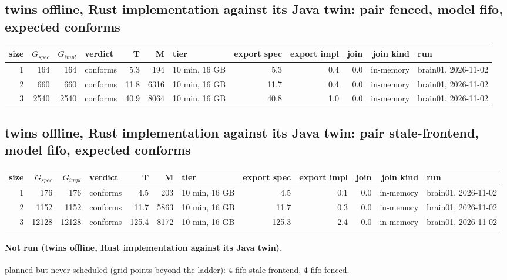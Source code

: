 \documentclass[10pt]{article}
\begin{document}
\subsection*{twins offline, Rust implementation against its Java twin: pair \textsf{fenced}, model fifo, expected conforms}
\begin{longtable}{@{}rrrlrrlrrrrl@{}}
\toprule
size & $G_{\mathit{spec}}$ & $G_{\mathit{impl}}$ & verdict & T & M & tier & export spec & export impl & join & join kind & run \\
\midrule
\endhead
\color{red} 1 & 164 & 164 & conforms & 5.3 & 194 & 10 min, 16 GB & 5.3 & 0.4 & 0.0 & in-memory & brain01, 2026-11-02 \\
\color{red} 2 & 660 & 660 & conforms & 11.8 & 6316 & 10 min, 16 GB & 11.7 & 0.4 & 0.0 & in-memory & brain01, 2026-11-02 \\
\color{red} 3 & 2540 & 2540 & conforms & 40.9 & 8064 & 10 min, 16 GB & 40.8 & 1.0 & 0.0 & in-memory & brain01, 2026-11-02 \\
\bottomrule
\end{longtable}
\subsection*{twins offline, Rust implementation against its Java twin: pair \textsf{stale-frontend}, model fifo, expected conforms}
\begin{longtable}{@{}rrrlrrlrrrrl@{}}
\toprule
size & $G_{\mathit{spec}}$ & $G_{\mathit{impl}}$ & verdict & T & M & tier & export spec & export impl & join & join kind & run \\
\midrule
\endhead
\color{red} 1 & 176 & 176 & conforms & 4.5 & 203 & 10 min, 16 GB & 4.5 & 0.1 & 0.0 & in-memory & brain01, 2026-11-02 \\
\color{red} 2 & 1152 & 1152 & conforms & 11.7 & 5863 & 10 min, 16 GB & 11.7 & 0.3 & 0.0 & in-memory & brain01, 2026-11-02 \\
\color{red} 3 & 12128 & 12128 & conforms & 125.4 & 8172 & 10 min, 16 GB & 125.3 & 2.4 & 0.0 & in-memory & brain01, 2026-11-02 \\
\bottomrule
\end{longtable}
\paragraph{Not run (twins offline, Rust implementation against its Java twin).}
planned but never scheduled (grid points beyond the ladder): 4 fifo stale-frontend, 4 fifo fenced.\par
\end{document}
